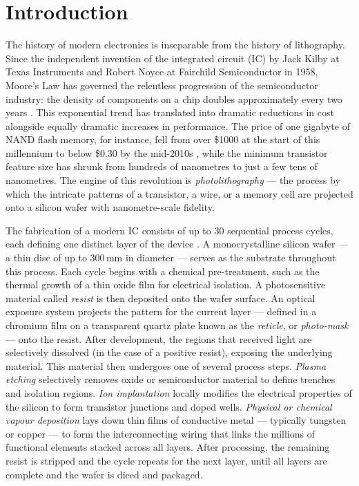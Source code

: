 \def\baselinestretch{1}

\chapter{Introduction}

\def\baselinestretch{1.66}

The history of modern electronics is inseparable from the history of lithography. Since the independent invention of the integrated circuit (IC) by Jack Kilby at Texas Instruments and Robert Noyce at Fairchild Semiconductor in 1958, Moore's Law has governed the relentless progression of the semiconductor industry: the density of components on a chip doubles approximately every two years \cite{Schmidt2012_UltraPrecision}. This exponential trend has translated into dramatic reductions in cost alongside equally dramatic increases in performance. The price of one gigabyte of NAND flash memory, for instance, fell from over \$1000 at the start of this millennium to below \$0.30 by the mid-2010s \cite{Butler2011_PositionControl}, while the minimum transistor feature size has shrunk from hundreds of nanometres to just a few tens of nanometres. The engine of this revolution is \textit{photolithography} — the process by which the intricate patterns of a transistor, a wire, or a memory cell are projected onto a silicon wafer with nanometre-scale fidelity.

The fabrication of a modern IC consists of up to 30 sequential process cycles, each defining one distinct layer of the device \cite{Schmidt2012_UltraPrecision}. A monocrystalline silicon wafer — a thin disc of up to 300\,mm in diameter — serves as the substrate throughout this process. Each cycle begins with a chemical pre-treatment, such as the thermal growth of a thin oxide film for electrical isolation. A photosensitive material called \textit{resist} is then deposited onto the wafer surface. An optical exposure system projects the pattern for the current layer — defined in a chromium film on a transparent quartz plate known as the \textit{reticle}, or \textit{photo-mask} — onto the resist. After development, the regions that received light are selectively dissolved (in the case of a positive resist), exposing the underlying material. This material then undergoes one of several process steps. \textit{Plasma etching} selectively removes oxide or semiconductor material to define trenches and isolation regions. \textit{Ion implantation} locally modifies the electrical properties of the silicon to form transistor junctions and doped wells. \textit{Physical or chemical vapour deposition} lays down thin films of conductive metal — typically tungsten or copper — to form the interconnecting wiring that links the millions of functional elements stacked across all layers. After processing, the remaining resist is stripped and the cycle repeats for the next layer, until all layers are complete and the wafer is diced and packaged.

